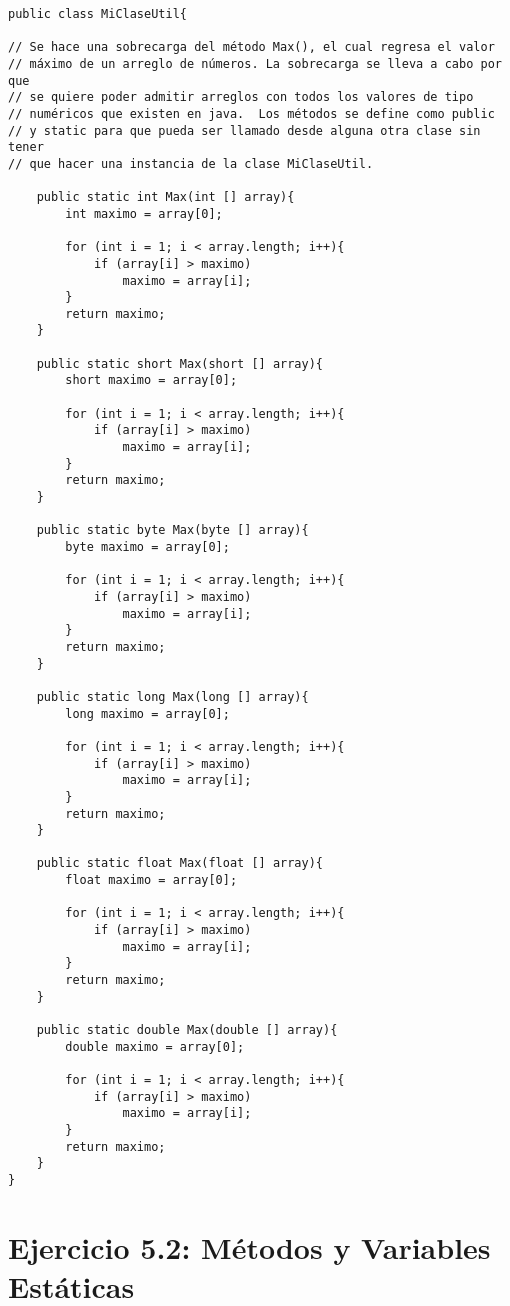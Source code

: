 \documentclass[11pt, oneside]{article}
\begin{document}
\begin{verbatim}
public class MiClaseUtil{

// Se hace una sobrecarga del método Max(), el cual regresa el valor
// máximo de un arreglo de números. La sobrecarga se lleva a cabo por que
// se quiere poder admitir arreglos con todos los valores de tipo
// numéricos que existen en java.  Los métodos se define como public
// y static para que pueda ser llamado desde alguna otra clase sin tener
// que hacer una instancia de la clase MiClaseUtil. 

	public static int Max(int [] array){
        int maximo = array[0];
         
        for (int i = 1; i < array.length; i++){
            if (array[i] > maximo)
                maximo = array[i];      
        }
        return maximo;
	}

	public static short Max(short [] array){
        short maximo = array[0];
         
        for (int i = 1; i < array.length; i++){
            if (array[i] > maximo)
                maximo = array[i];      
        }
        return maximo;
	}

	public static byte Max(byte [] array){
        byte maximo = array[0];
         
        for (int i = 1; i < array.length; i++){
            if (array[i] > maximo)
                maximo = array[i];      
        }
        return maximo;
	}

	public static long Max(long [] array){
        long maximo = array[0];
         
        for (int i = 1; i < array.length; i++){
            if (array[i] > maximo)
                maximo = array[i];      
        }
        return maximo;
	}

	public static float Max(float [] array){
        float maximo = array[0];
         
        for (int i = 1; i < array.length; i++){
            if (array[i] > maximo)
                maximo = array[i];      
        }
        return maximo;
	}

	public static double Max(double [] array){
        double maximo = array[0];
         
        for (int i = 1; i < array.length; i++){
            if (array[i] > maximo)
                maximo = array[i];      
        }
        return maximo;
	}
}
\end{verbatim}

\section*{Ejercicio 5.2: Métodos y Variables Estáticas}
\end{document}
